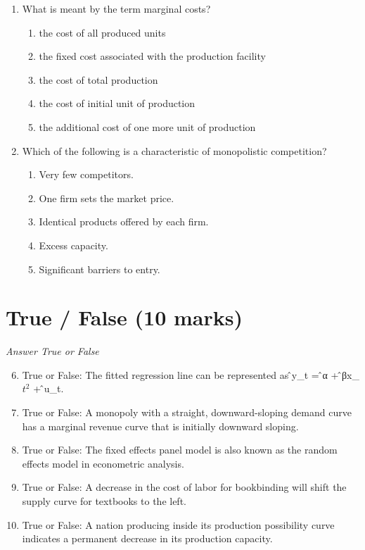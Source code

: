 \documentclass[12pt]{article}
\begin{document}
\begin{enumerate}[label=\arabic*.]
\begin{enumerate}[label=(\alph*)]
    \item If both the demand and supply curves are price elastic
    \item If the demand curve is price elastic and the supply curve is price inelastic
\end{enumerate}
\item What is meant by the term marginal costs?
\begin{enumerate}[label=(\alph*)]
    \item the cost of all produced units
    \item the fixed cost associated with the production facility
    \item the cost of total production
    \item the cost of initial unit of production
    \item the additional cost of one more unit of production
\end{enumerate}
\item Which of the following is a characteristic of monopolistic competition?
\begin{enumerate}[label=(\alph*)]
    \item Very few competitors.
    \item One firm sets the market price.
    \item Identical products offered by each firm.
    \item Excess capacity.
    \item Significant barriers to entry.
\end{enumerate}
\end{enumerate}

\section*{True / False (10 marks)}
\textit{Answer True or False}
\begin{enumerate}[label=\arabic*.]
\setcounter{enumi}{5}
\item True or False: The fitted regression line can be represented as ̂y\_t = ̂α + ̂βx\_$t^2$ + ̂u\_t.
\item True or False: A monopoly with a straight, downward-sloping demand curve has a marginal revenue curve that is initially downward sloping.
\item True or False: The fixed effects panel model is also known as the random effects model in econometric analysis.
\item True or False: A decrease in the cost of labor for bookbinding will shift the supply curve for textbooks to the left.
\item True or False: A nation producing inside its production possibility curve indicates a permanent decrease in its production capacity.
\end{enumerate}
\end{document}
